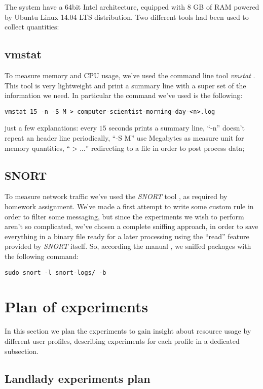 \documentclass[10pt,a4paper]{article}
\begin{document}
    The system have a 64bit Intel architecture, equipped with 8 GB of
    RAM powered by Ubuntu Linux 14.04 LTS distribution. Two different
    tools had been used to collect quantities:

    \subsection{vmstat} 
    To measure memory and CPU usage, we've used the command line tool
    \emph{vmstat} \cite{vmstat}. This tool is very lightweight and
    print a summary line with a super set of the information we
    need. In particular the command we've used is the following:
\begin{verbatim}
vmstat 15 -n -S M > computer-scientist-morning-day-<n>.log
\end{verbatim}
    just a few explanations: every $15$ seconds prints a summary line,
    ``-n'' doesn't repeat an header line periodically, ``-S M'' use
    Megabytes as measure unit for memory quantities, ``$> ...$''
    redirecting to a file in order to post process data;

    \subsection{SNORT} 
    To measure network traffic we've used the \emph{SNORT} tool
    \cite{SNORT}, as required by homework assignment. We've made a
    first attempt to write some custom rule in order to filter some
    messaging, but since the experiments we wish to perform aren't so
    complicated, we've chosen a complete sniffing approach, in order
    to save everything in a binary file ready for a later processing
    using the ``read'' feature provided by \emph{SNORT} itself. So,
    according the manual \cite{SNORT-manual}, we sniffed packages with
    the following command:
\begin{verbatim}
sudo snort -l snort-logs/ -b
\end{verbatim}


    \section{Plan of experiments}
    \label{sec:plan-of-experiment}
    In this section we plan the experiments to gain insight about
    resource usage by different user profiles, describing experiments
    for each profile in a dedicated subsection.

    \subsection{Landlady experiments plan}
\end{document}
